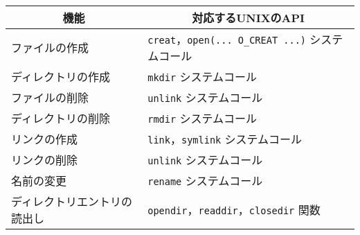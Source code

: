 \documentclass{standalone}
\def\|{\verb|} %|
\begin{document}
\begin{tabular}{l | l}\hline\hline
  \multicolumn{1}{c|}{機能} & \multicolumn{1}{c}{対応するUNIXのAPI}\\\hline
  ファイルの作成     &  \|creat|，\|open(... O_CREAT ...)| システムコール \\
  ディレクトリの作成 &  \|mkdir| システムコール \\
  ファイルの削除     &  \|unlink| システムコール \\
  ディレクトリの削除 &  \|rmdir| システムコール \\
  リンクの作成       &  \|link|，\|symlink| システムコール　\\
  リンクの削除       &  \|unlink| システムコール　\\
  名前の変更         &  \|rename| システムコール\\
  ディレクトリエントリの読出し & \|opendir|，\|readdir|，\|closedir| 関数\\
\end{tabular}
\end{document}
